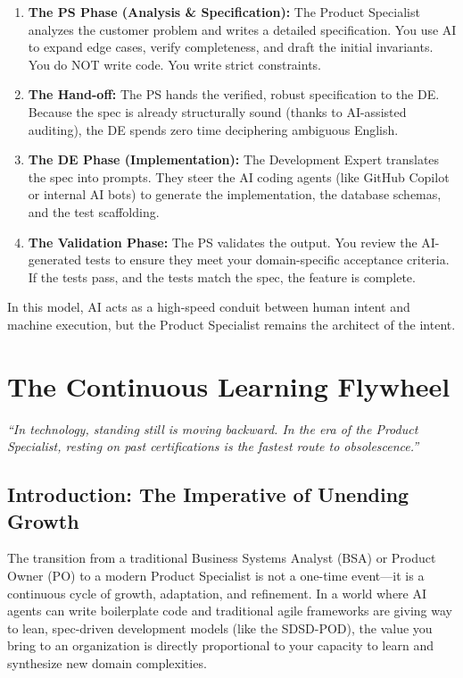 \documentclass[
  11pt,
  openany,
  oneside]{book}
\providecommand{\tightlist}{%
  \setlength{\itemsep}{0pt}\setlength{\parskip}{0pt}}
\renewenvironment{quote}{\begin{customquote}}{\end{customquote}}
\begin{document}
\begin{enumerate}
\def\labelenumi{\arabic{enumi}.}
\tightlist
\item
  \textbf{The PS Phase (Analysis \& Specification):} The Product
  Specialist analyzes the customer problem and writes a detailed
  specification. You use AI to expand edge cases, verify completeness,
  and draft the initial invariants. You do NOT write code. You write
  strict constraints.
\item
  \textbf{The Hand-off:} The PS hands the verified, robust specification
  to the DE. Because the spec is already structurally sound (thanks to
  AI-assisted auditing), the DE spends zero time deciphering ambiguous
  English.
\item
  \textbf{The DE Phase (Implementation):} The Development Expert
  translates the spec into prompts. They steer the AI coding agents
  (like GitHub Copilot or internal AI bots) to generate the
  implementation, the database schemas, and the test scaffolding.
\item
  \textbf{The Validation Phase:} The PS validates the output. You review
  the AI-generated tests to ensure they meet your domain-specific
  acceptance criteria. If the tests pass, and the tests match the spec,
  the feature is complete.
\end{enumerate}

In this model, AI acts as a high-speed conduit between human intent and
machine execution, but the Product Specialist remains the architect of
the intent.

\chapter{The Continuous Learning
Flywheel}\label{the-continuous-learning-flywheel-1}

\begin{quote}
\emph{``In technology, standing still is moving backward. In the era of
the Product Specialist, resting on past certifications is the fastest
route to obsolescence.''}
\end{quote}

\section{Introduction: The Imperative of Unending
Growth}\label{introduction-the-imperative-of-unending-growth}

The transition from a traditional Business Systems Analyst (BSA) or
Product Owner (PO) to a modern Product Specialist is not a one-time
event---it is a continuous cycle of growth, adaptation, and refinement.
In a world where AI agents can write boilerplate code and traditional
agile frameworks are giving way to lean, spec-driven development models
(like the SDSD-POD), the value you bring to an organization is directly
proportional to your capacity to learn and synthesize new domain
complexities.
\end{document}
